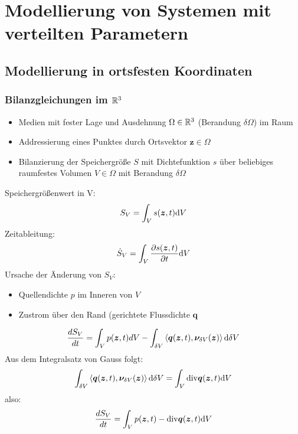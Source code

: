 \newpage
\section{Modellierung von Systemen mit verteilten Parametern}
\subsection{Modellierung in ortsfesten Koordinaten}
\label{sec:modortsfest}
\subsubsection{Bilanzgleichungen im $\mathbb{R}^3$}
\begin{itemize}
\item Medien mit fester Lage und Ausdehnung $\Omega \in \mathbb{R}^3$ (Berandung $\delta \Omega$) im Raum
\item Addressierung eines Punktes durch Ortsvektor $\bm{z}\in \Omega$
\item Bilanzierung der Speichergröße $S$ mit Dichtefunktion $s$ über beliebiges raumfestes Volumen $V \in \Omega$ mit Berandung $\delta \Omega$
\end{itemize}
Speichergrößenwert in V:
\begin{align}
\label{eq:speichergroesse}
S_V = \int_V s(\bm{z},t) \mathrm{d} V
\end{align}
Zeitableitung:
\begin{align}
\label{eq:diffspeichergroesse}
\dot{S}_V = \int_V \frac{\partial s(\bm{z},t)}{\partial t}\mathrm{d} V
\end{align}
Ursache der Änderung von $S_V$:
\begin{itemize}
\item Quellendichte $p$ im Inneren von $V$
\item Zustrom über den Rand (gerichtete Flussdichte $\bm{q}$
\end{itemize}
 \begin{align}
 \label{eq:ursache}
 \frac{dS_V}{dt} = \int_V p(\bm{z},t)dV - \int_{\delta V} \left\langle  \bm{q}(\bm{z},t),\bm{\nu}_{\delta V}(\bm{z})\right\rangle \mathrm{d}  \delta V
 \end{align}
Aus dem Integralsatz von Gauss folgt:
 \begin{align}
 \label{eq:satzvongauss}
  \int_{\delta V} \left\langle  \bm{q}(\bm{z},t),\bm{\nu}_{\delta V}(\bm{z})\right\rangle \mathrm{d} \delta V = \int_V \mathrm{div} \bm{q}(\bm{z},t) \mathrm{d} V
 \end{align}
 also:
 \begin{align*}
 \frac{dS_V}{dt} = \int_V p(\bm{z},t) - \mathrm{div} \bm{q}(\bm{z},t) \mathrm{d} V
 \end{align*}
